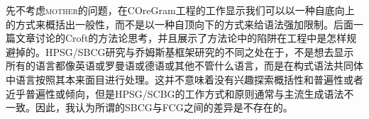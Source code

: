 先不考虑\textsc{mother}的问题，在COreGram工程\citep{MuellerCoreGramBrief,MuellerCoreGram}的工作显示我们可以以一种自底向上的方式来概括出一般性，而不是以一种自顶向下的方式来给语法强加限制。后面一篇文章讨论的Croft的方法论思考，并且展示了方法论中的陷阱在工程中是怎样规避掉的。HPSG/SBCG研究与乔姆斯基框架研究的不同之处在于，不是想去显示所有的语言都像英语或罗曼语或德语或其他不管什么语言，而是在构式语法共同体中语言按照其本来面目进行处理。这并不意味着没有兴趣探索概括性和普遍性或者近乎普遍性或倾向，但是HPSG/SCBG的工作方式和原则通常与主流生成语法不一致。因此，我认为所谓的SBCG与FCG之间的差异是不存在的。


